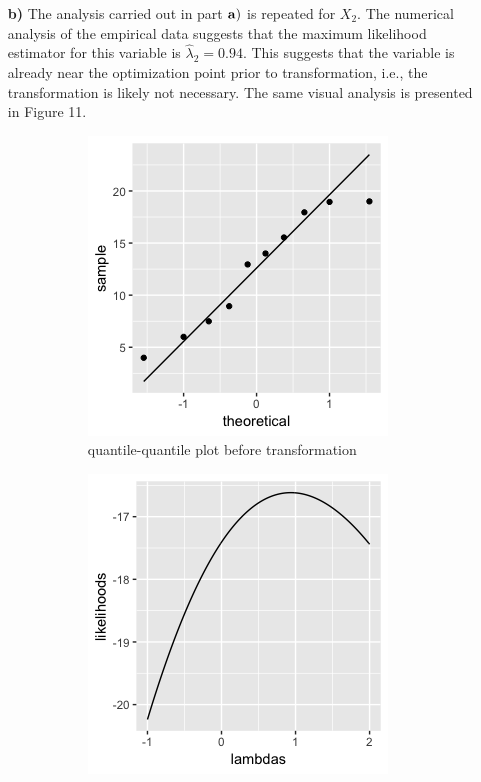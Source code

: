 \begin{enumerate}
	\item[\bf{b)}] The analysis carried out in part $\bf{a)}$ is repeated for $X_2$. The numerical analysis of the empirical data suggests that the maximum likelihood estimator for this variable is $\hat{\lambda}_2 = 0.94$. This suggests that the variable is already near the optimization point prior to transformation, i.e., the transformation is likely not necessary. The same visual analysis is presented in Figure 11.
\begin{figure}[H]
\begin{subfigure}{.33\textwidth}
  \centering
	\includegraphics[width=.8\linewidth]{plot_4_30_b_qq.png}
  \caption{quantile-quantile plot before transformation}
  \label{fig:sfig1}
\end{subfigure}%
\begin{subfigure}{.33\textwidth}
  \centering
	\includegraphics[width=.8\linewidth]{plot_4_30_b_bxcx.png}

\end{subfigure}
\end{figure}
\end{enumerate}
